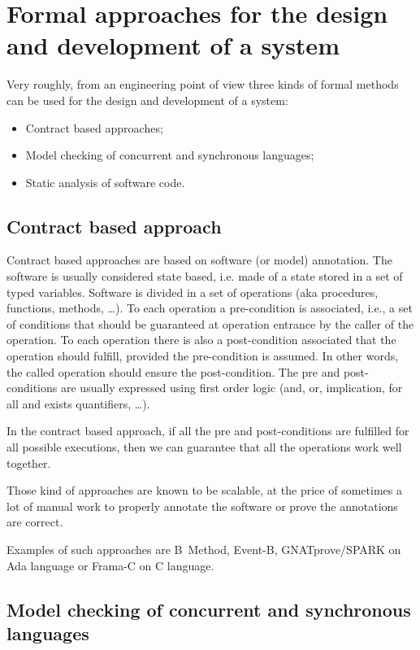 \section{Formal approaches for the design and development of a system}


Very roughly, from an engineering point of view three kinds of formal
methods can be used for the design and development of a system:
\begin{itemize}
\item Contract based approaches;
\item Model checking of concurrent and synchronous languages;
\item Static analysis of software code.
\end{itemize}

\subsection{Contract based approach}
\label{sec:contr-based-appr}

Contract based approaches are based on software (or model)
annotation. The software is usually considered state based, i.e. made of
a state stored in a set of typed variables.  Software is divided in a
set of operations (aka procedures, functions, methods, \ldots). To each
operation a pre-condition is associated, i.e., a set of conditions that
should be guaranteed at operation entrance by the caller of the
operation. To each operation there is also a post-condition associated
that the operation should fulfill, provided the pre-condition is
assumed. In other words, the called operation should ensure the
post-condition. The pre and post-conditions are usually expressed using
first order logic (and, or, implication, for all and exists quantifiers,
\ldots).

In the contract based approach, if all the pre and post-conditions are
fulfilled for all possible executions, then we can guarantee that all
the operations work well together.

Those kind of approaches are known to be scalable, at the price of
sometimes a lot of manual work to properly annotate the software or
prove the annotations are correct.

Examples of such approaches are B~Method, Event-B, GNATprove/SPARK on
Ada language or Frama-C on C language.

\subsection{Model checking of concurrent and synchronous languages}

